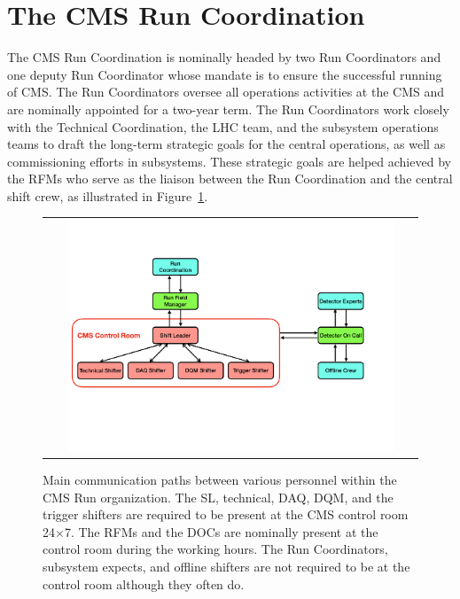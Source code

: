 \section{The CMS Run Coordination}
\label{sec:RC}

The \ac{CMS} Run Coordination is nominally headed by two Run Coordinators and one deputy Run Coordinator whose mandate is to ensure the successful running of \ac{CMS}. The Run Coordinators oversee all operations activities at the \ac{CMS} and are nominally appointed for a two-year term. The Run Coordinators work closely with the Technical Coordination, the \ac{LHC} team, and the subsystem operations teams to draft the long-term strategic goals for the central operations, as well as commissioning efforts in subsystems. These strategic goals are helped achieved by the \acp{RFM} who serve as the liaison between the Run Coordination and the central shift crew, as illustrated in Figure~\ref{fig:RC}.

\begin{figure}[tbh!]
 \begin{center}
 \begin{tabular}{c}
 \includegraphics[width=0.9\textwidth]{figures/Part2/Operation/RC}
 \end{tabular}
 \caption{Main communication paths between various personnel within the \ac{CMS} Run organization. The \ac{SL}, technical, \ac{DAQ}, \ac{DQM}, and the trigger shifters are required to be present at the \ac{CMS} control room 24$\times$7. The \acp{RFM} and the \acp{DOC} are nominally present at the control room during the working hours. The Run Coordinators, subsystem expects, and offline shifters are not required to be at the control room although they often do.}
 \label{fig:RC}
 \end{center}
\end{figure}

